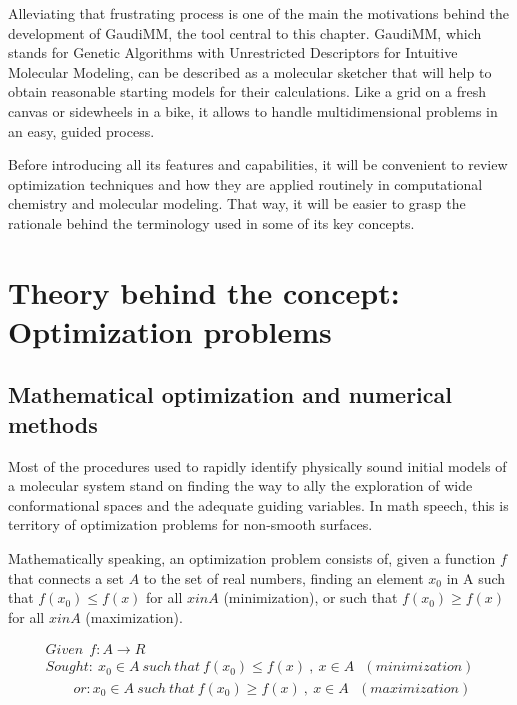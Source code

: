 Alleviating that frustrating process is one of the main the motivations behind the development of GaudiMM, the tool central to this chapter. GaudiMM, which stands for Genetic Algorithms with Unrestricted Descriptors for Intuitive Molecular Modeling, can be described as a molecular sketcher that will help to obtain reasonable starting models for their calculations. Like a grid on a fresh canvas or sidewheels in a bike, it allows to handle multidimensional problems in an easy, guided process.

Before introducing all its features and capabilities, it will be convenient to review optimization techniques and how they are applied routinely in computational chemistry and molecular modeling. That way, it will be easier to grasp the rationale behind the terminology used in some of its key concepts.

\section{Theory behind the concept: Optimization problems}
\subsection{Mathematical optimization and numerical methods}
Most of the procedures used to rapidly identify physically sound initial models of a molecular system stand on finding the way to ally the exploration of wide conformational spaces and the adequate guiding variables. In math speech, this is territory of optimization problems for non-smooth surfaces.

Mathematically speaking, an optimization problem consists of, given a function $ f $ that connects a set $ A $ to the set of real numbers, finding an element $ x_{0} $ in A such that $ f(x_{0}) \leq f(x) $ for all $ x in A $  (minimization), or such that $ f(x_{0}) \geq f(x) $ for all $ x in A $ (maximization).

\begin{align}
	Given ~~ f:A \rightarrow R \nonumber \\
	Sought: ~ x_{0} \in A ~ such ~ that ~ f(x_{0})  \leq f(x) ~,~x \in A ~~~ ( minimization ) \nonumber \\
	~~~~~~~~~ or: x_{0} \in A ~ such ~ that ~ f(x_{0})  \geq f(x) ~,~x \in A ~~~ ( maximization )
\end{align}

